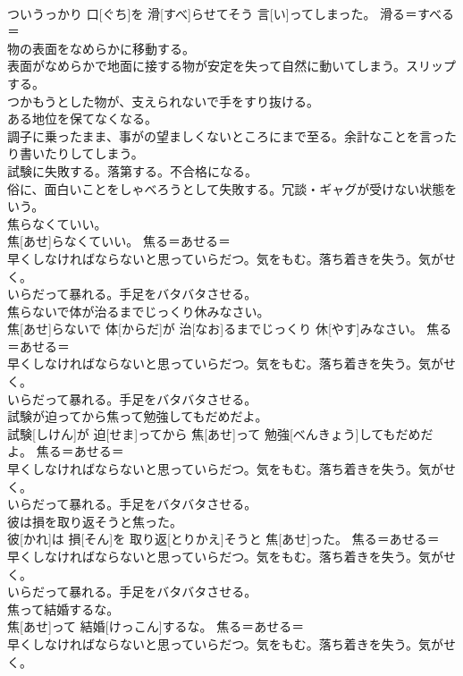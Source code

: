 \documentclass[8pt]{extreport}
\begin{document}
\begin{CJK}{UTF8}{min}
{\\	ついうっかり 口[ぐち]を 滑[すべ]らせてそう 言[い]ってしまった。	滑る＝すべる＝ 
\\	物の表面をなめらかに移動する。 
\\	表面がなめらかで地面に接する物が安定を失って自然に動いてしまう。スリップする。 
\\	つかもうとした物が、支えられないで手をすり抜ける。 
\\	ある地位を保てなくなる。 
\\	調子に乗ったまま、事がの望ましくないところにまで至る。余計なことを言ったり書いたりしてしまう。 
\\	試験に失敗する。落第する。不合格になる。 
\\	俗に、面白いことをしゃべろうとして失敗する。冗談・ギャグが受けない状態をいう。
\\	焦らなくていい。	
\\	焦[あせ]らなくていい。	焦る＝あせる＝ 
\\	早くしなければならないと思っていらだつ。気をもむ。落ち着きを失う。気がせく。 
\\	いらだって暴れる。手足をバタバタさせる。
\\	焦らないで体が治るまでじっくり休みなさい。	
\\	焦[あせ]らないで 体[からだ]が 治[なお]るまでじっくり 休[やす]みなさい。	焦る＝あせる＝ 
\\	早くしなければならないと思っていらだつ。気をもむ。落ち着きを失う。気がせく。 
\\	いらだって暴れる。手足をバタバタさせる。
\\	試験が迫ってから焦って勉強してもだめだよ。	
\\	試験[しけん]が 迫[せま]ってから 焦[あせ]って 勉強[べんきょう]してもだめだよ。	焦る＝あせる＝ 
\\	早くしなければならないと思っていらだつ。気をもむ。落ち着きを失う。気がせく。 
\\	いらだって暴れる。手足をバタバタさせる。
\\	彼は損を取り返そうと焦った。	
\\	彼[かれ]は 損[そん]を 取り返[とりかえ]そうと 焦[あせ]った。	焦る＝あせる＝ 
\\	早くしなければならないと思っていらだつ。気をもむ。落ち着きを失う。気がせく。 
\\	いらだって暴れる。手足をバタバタさせる。
\\	焦って結婚するな。	
\\	焦[あせ]って 結婚[けっこん]するな。	焦る＝あせる＝ 
\\	早くしなければならないと思っていらだつ。気をもむ。落ち着きを失う。気がせく。 
}
\end{CJK}
\end{document}
